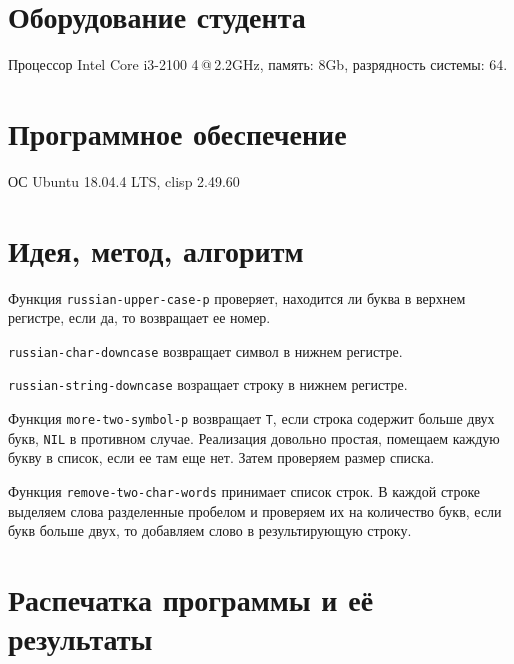 \documentclass[12pt]{article}
\begin{document}
\section{Оборудование студента}
Процессор Intel Core i3-2100 4\,@\,2.2GHz, память: 8Gb, разрядность системы: 64.

\section{Программное обеспечение}
ОС Ubuntu 18.04.4 LTS, clisp 2.49.60

\pagebreak

\section{Идея, метод, алгоритм}
Функция {\tt russian-upper-case-p} проверяет, находится ли буква в верхнем регистре, если да, то возвращает ее номер.

{\tt russian-char-downcase} возвращает символ в нижнем регистре.

{\tt russian-string-downcase} возращает строку в нижнем регистре.

Функция {\tt more-two-symbol-p} возвращает {\tt T}, если строка содержит больше двух букв, {\tt NIL} в противном случае.
Реализация довольно простая, помещаем каждую букву в список, если ее там еще нет. Затем проверяем размер списка.

Функция {\tt remove-two-char-words} принимает список строк. В каждой строке выделяем слова разделенные пробелом и проверяем их на количество букв, если букв больше двух, то добавляем слово в результирующую строку.

\section{Распечатка программы и её результаты}
\end{document}

